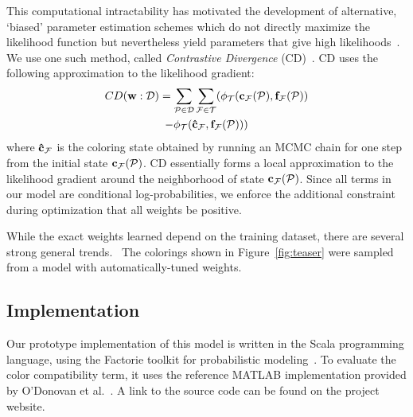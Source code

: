 This computational intractability has motivated the development of alternative, `biased' parameter estimation schemes which do not directly maximize the likelihood function but nevertheless yield parameters that give high likelihoods~\cite{NonMLEParameterEstimation}. We use one such method, called \emph{Contrastive Divergence} (CD)~\cite{ContrastiveDivergence}. CD uses the following approximation to the likelihood gradient:
\begin{multline*}
CD(\mathbf{w} : \mathcal{D}) = 
	\sum_{\mathcal{P} \in \mathcal{D}}
		\sum_{\mathcal{F} \in \mathcal{T}}
		(
			\phi_{\mathcal{T}}(\mathbf{c_{\mathcal{F}}}(\mathcal{P}),\mathbf{f_{\mathcal{F}}}(\mathcal{P})) \\
			- \phi_{\mathcal{T}}(\mathbf{\hat{c}_{\mathcal{F}}},\mathbf{f_{\mathcal{F}}}(\mathcal{P}))
		)
\end{multline*}
where $\mathbf{\hat{c}_{\mathcal{F}}}$ is the coloring state obtained by running an MCMC chain for one step from the initial state $\mathbf{c_{\mathcal{F}}}(\mathcal{P})$. CD essentially forms a local approximation to the likelihood gradient around the neighborhood of state $\mathbf{c_{\mathcal{F}}}(\mathcal{P})$. Since all terms in our model are conditional log-probabilities, we enforce the additional constraint during optimization that all weights be positive.~

While the exact weights learned depend on the training dataset, there are several strong general trends.~ The colorings shown in Figure~\ref{fig:teaser} were sampled from a model with automatically-tuned weights.

\subsection{Implementation}
\label{sec:implementation}

Our prototype implementation of this model is written in the Scala programming language, using the Factorie toolkit for probabilistic modeling~\cite{Factorie}. To evaluate the color compatibility term, it uses the reference MATLAB implementation provided by O'Donovan et al.~. A link to the source code can be found on the project website.